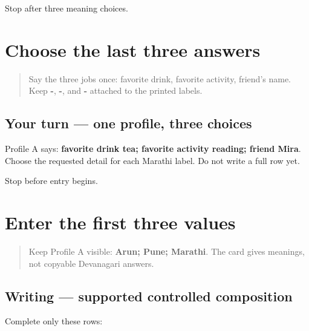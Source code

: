 \begin{tcolorbox}[breakable,colback=teal!4,colframe=teal!35!black,title={Before you move on}]
Stop after three meaning choices.
\end{tcolorbox}
\section[\texorpdfstring{\mr{आवडते} \mr{पेय} · \mr{आवडती} … (āvaḍte pey …)}{आवडते पेय · आवडती … (āvaḍte pey …)}]{Choose the last three answers}

\label{lesson:MR-A1F05-last-three-select}



\begin{quote}
Say the three jobs once: favorite drink, favorite activity, friend's name. Keep \textbf{-}, \textbf{-}, and \textbf{-} attached to the printed labels.
\end{quote}

\subsection*{Your turn — one profile, three choices}
Profile A says: \textbf{favorite drink tea; favorite activity reading; friend Mira}. Choose the requested detail for each Marathi label. Do not write a full row yet.

\begin{tcolorbox}[breakable,colback=teal!4,colframe=teal!35!black,title={Before you move on}]
Stop before entry begins.
\end{tcolorbox}
\section[\texorpdfstring{\mr{नाव} … (nāv …)}{नाव … (nāv …)}]{Enter the first three values}

\label{lesson:MR-A1F06-first-three-supported}



\begin{quote}
Keep Profile A visible: \textbf{Arun; Pune; Marathi}. The card gives meanings, not copyable Devanagari answers.
\end{quote}

\subsection*{Writing — supported controlled composition}
Complete only these rows:

